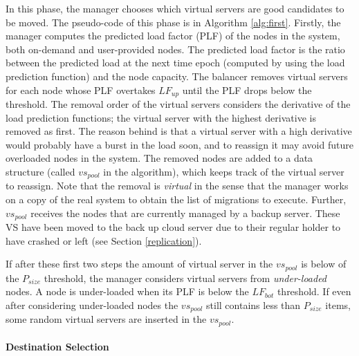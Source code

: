 \documentclass[final,10pt,a5paper]{phdimt}
\theoremstyle{definition}
\begin{document}
In this phase, the manager chooses which virtual servers are good candidates to be moved. The pseudo-code of this phase is in Algorithm \ref{alg:first}. 
Firstly, the manager computes the predicted load factor (PLF) of the nodes in the system, both on-demand and user-provided nodes. The predicted load factor is the ratio between the predicted load at the next time epoch (computed by using the load prediction function) and the node capacity. The balancer removes virtual servers for each node whose PLF overtakes $LF_{up}$ until the PLF drops below the threshold. The removal order of the virtual servers considers the derivative of the load prediction functions; the virtual server with the highest derivative is removed as first.  
The reason behind is that a virtual server with a high derivative would probably have a burst in the load soon, and to reassign it 
may avoid future overloaded nodes in the system.
The removed nodes are added to a data structure (called $vs_{pool}$ in the algorithm), which keeps track of the virtual server to reassign. Note that the removal is \textit{virtual} in the sense that the manager works on a copy of the real system to obtain the list of migrations to execute. 
Further, $vs_{pool}$ receives the nodes that are currently managed by a backup server. These VS have been moved to the back up cloud server due to their regular holder to have crashed or left (see Section \ref{replication}).




If after these first two steps the amount of virtual server in the $vs_{pool}$ is below of the $P_{size}$ threshold, the manager considers virtual servers from \textit{under-loaded} nodes.
A node is under-loaded when its PLF is below the $LF_{bot}$ threshold.
If even after considering under-loaded nodes the $vs_{pool}$ still contains less than $P_{size}$ items, some random virtual servers are inserted in the $vs_{pool}$.


\paragraph{Destination Selection}
\end{document}
